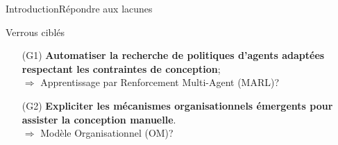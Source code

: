 \begin{frame}{Introduction}{Répondre aux lacunes}

    \begin{exampleblock}{Verrous ciblés}
        \begin{enumerate}
            \item[\phantom{X} (G1)] \textbf{Automatiser la recherche de politiques d'agents adaptées respectant les contraintes de conception};
                \\ $\Longrightarrow$ Apprentissage par Renforcement Multi-Agent (MARL)?
            \item[\phantom{X} (G2)] \textbf{Expliciter les mécanismes organisationnels émergents pour assister la conception manuelle}.
                \\ $\Longrightarrow$ Modèle Organisationnel (OM)?
        \end{enumerate}
    \end{exampleblock}


    \begin{table}[]


\end{table}
\end{frame}
